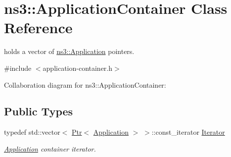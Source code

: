 \hypertarget{classns3_1_1ApplicationContainer}{}\section{ns3\+:\+:Application\+Container Class Reference}
\label{classns3_1_1ApplicationContainer}


holds a vector of \hyperlink{classns3_1_1Application}{ns3\+::\+Application} pointers.  




{\ttfamily \#include $<$application-\/container.\+h$>$}



Collaboration diagram for ns3\+:\+:Application\+Container\+:
\subsection*{Public Types}
\begin{DoxyCompactItemize}
\item 
typedef std\+::vector$<$ \hyperlink{classns3_1_1Ptr}{Ptr}$<$ \hyperlink{classns3_1_1Application}{Application} $>$ $>$\+::const\+\_\+iterator \hyperlink{classns3_1_1ApplicationContainer_a46d9e435701ffbca57fff95b97cbf0dc}{Iterator}
\begin{DoxyCompactList}\small\item\em \hyperlink{classns3_1_1Application}{Application} container iterator. \end{DoxyCompactList}\end{DoxyCompactItemize}
